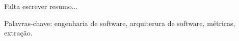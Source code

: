 \documentclass[normaltoc,capchap,capsec,times]{abnt}
\begin{document}
\capa
\folhaderosto

\begin{resumo}
 Falta escrever resumo...

 Palavras-chave: engenharia de software, arquiterura de software, métricas, extração.
\end{resumo}

\sumario



{}

\end{document}
